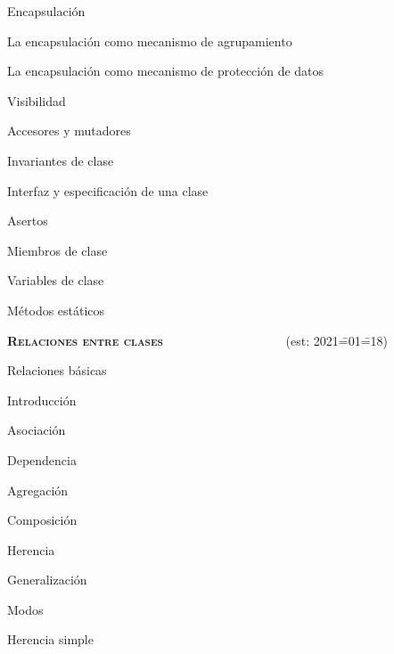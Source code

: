 \begin{longenum}
\begin{longenum}
        \item Encapsulación
        \begin{longenum}
            \item La encapsulación como mecanismo de agrupamiento
            \item La encapsulación como mecanismo de protección de datos
            \begin{longenum}
                \item Visibilidad
                \item Accesores y mutadores
                \item Invariantes de clase
                \item Interfaz y especificación de una clase
                \item Asertos
            \end{longenum}
        \end{longenum}
        \item Miembros de clase
        \begin{longenum}
            \item Variables de clase
            \item Métodos estáticos
        \end{longenum}
    \end{longenum}
    \item \textbf{\textsc{Relaciones entre clases}} \ \ \ \ \ \ \ \ \ \ \ \ \ \ \ \ \ \ \ (est: 2021\==01\==18)
    \begin{longenum}
        \item Relaciones básicas
        \begin{longenum}
            \item Introducción
            \item Asociación
            \item Dependencia
            \item Agregación
            \item Composición
        \end{longenum}
        \item Herencia
        \begin{longenum}
            \item Generalización
            \item Modos
            \begin{longenum}
                \item Herencia simple

\end{longenum}
\end{longenum}
\end{longenum}
\end{longenum}
